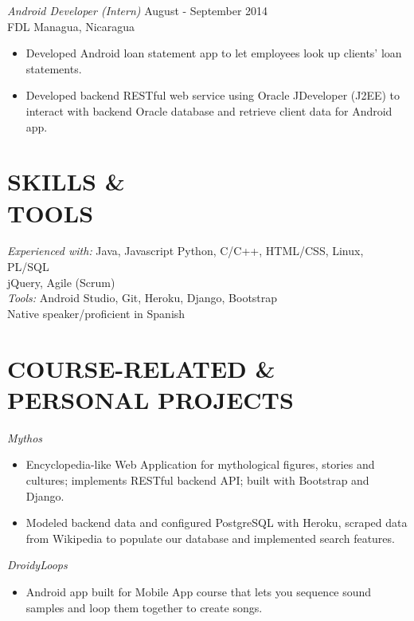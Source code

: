 \documentclass[line,margin]{res}
\begin{document}
\begin{resume}
    {\sl Android Developer (Intern) } \hfill August - September 2014 \\
    { FDL } \hfill Managua, Nicaragua \\
     \begin{itemize} \itemsep -2pt %
        \item \small Developed Android loan statement app to let employees look up clients' loan statements.
        \item \small Developed backend RESTful web service using Oracle JDeveloper (J2EE) to interact with backend Oracle database and retrieve client data for Android app.
    \end{itemize}

\section{SKILLS \&\\ TOOLS} \small {\sl Experienced with:} Java, Javascript Python, C/C++, HTML/CSS, Linux, PL/SQL \\
                jQuery, Agile (Scrum) \\
                \small {\sl Tools:} Android Studio, Git, Heroku, Django, Bootstrap
                \\\small Native speaker/proficient in Spanish

\section{COURSE-RELATED \& PERSONAL PROJECTS}
    {\sl Mythos}
    \begin{itemize} \itemsep -2pt %
    \item \small Encyclopedia-like Web Application for mythological figures, stories and cultures; implements RESTful backend API; built with Bootstrap and Django.
    \item \small Modeled backend data and configured PostgreSQL with Heroku, scraped data from Wikipedia to populate our database and implemented search features.
    \end{itemize}

    {\sl DroidyLoops}
    \begin{itemize} \itemsep -2pt
    \item \small Android app built for Mobile App course that lets you sequence sound samples and loop them together to create songs.
    \end{itemize}

\end{resume}
\end{document}
